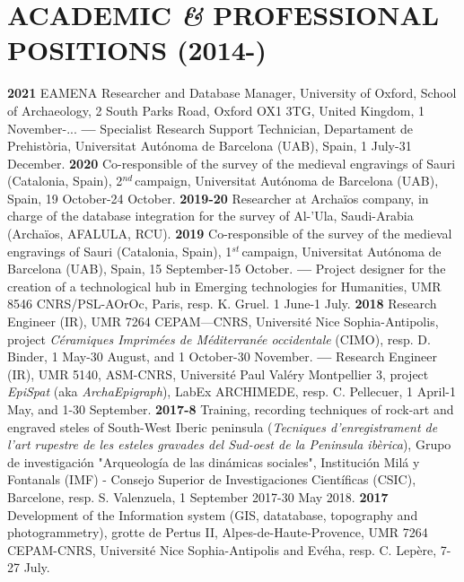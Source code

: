 \documentclass{article}
\begin{document}
\section{ACADEMIC \textit{\&} PROFESSIONAL POSITIONS (2014-)}

\textbf{2021 }EAMENA Researcher and Database Manager, University of Oxford, School of Archaeology, 2 South Parks Road, Oxford OX1 3TG, United Kingdom, 1 November-...
\smallbreak
\textbf{--- }Specialist Research Support Technician, Departament de Prehist\`oria, Universitat Aut\'{o}noma de Barcelona (UAB), Spain, 1 July-31 December.
\smallbreak
\textbf{2020 }Co-responsible of the survey of the medieval engravings of Sauri (Catalonia, Spain), 2${}^{nd\ }$campaign, Universitat Aut\'{o}noma de Barcelona (UAB), Spain, 19 October-24 October.
\smallbreak
\textbf{2019-20 }Researcher at Archa\"{i}os company, in charge of the database integration for the survey of Al-'Ula, Saudi-Arabia (Archa\"{i}os, AFALULA, RCU).
\smallbreak
\textbf{2019 }Co-responsible of the survey of the medieval engravings of Sauri (Catalonia, Spain), 1${}^{st\ }$campaign, Universitat Aut\'{o}noma de Barcelona (UAB), Spain, 15 September-15 October.
\smallbreak
\textbf{--- }Project designer for the creation of a technological hub in Emerging technologies for Humanities, UMR 8546 CNRS/PSL-AOrOc, Paris, resp. K. Gruel. 1 June-1 July.
\smallbreak
\textbf{2018 }Research Engineer (IR), UMR 7264 CEPAM---CNRS, Universit\'{e} Nice Sophia-Antipolis, project \textit{C\'{e}ramiques Imprim\'{e}es de M\'{e}diterran\'{e}e occidentale} (CIMO), resp. D. Binder, 1 May-30 August, and 1 October-30 November.
\smallbreak
\textbf{--- }Research Engineer (IR), UMR 5140, ASM-CNRS, Universit\'{e} Paul Val\'{e}ry Montpellier 3, project \textit{EpiSpat} (aka \textit{ArchaEpigraph}), LabEx ARCHIMEDE, resp. C. Pellecuer, 1 April-1 May, and 1-30 September.
\smallbreak
\textbf{2017-8 }Training, recording techniques of rock-art and engraved steles of South-West Iberic peninsula (\textit{Tecniques d'enregistrament de l'art rupestre de les esteles gravades del Sud-oest de la Peninsula ibèrica}), Grupo de investigaci\'{o}n "Arqueolog\'{i}a de las din\'{a}micas sociales", Instituci\'{o}n Mil\'{a} y Fontanals (IMF) - Consejo Superior de Investigaciones Cient\'{i}ficas (CSIC), Barcelone, resp. S. Valenzuela, 1 September 2017-30 May 2018.
\smallbreak
\textbf{2017 }Development of the Information system (GIS, datatabase, topography and photogrammetry), grotte de Pertus II, Alpes-de-Haute-Provence, UMR 7264 CEPAM-CNRS, Universit\'{e} Nice Sophia-Antipolis and Ev\'{e}ha, resp. C. Lep\`{e}re, 7-27 July.
\end{document}

